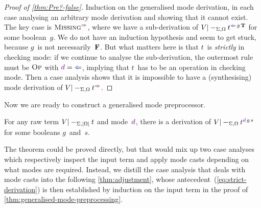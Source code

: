 \begin{proof}[Proof of \cref{thm:Pre?-false}]
Induction on the generalised mode derivation, in each case analysing an arbitrary mode derivation and showing that it cannot exist.
The key case is $\SynRule{Missing}$, where we have a sub-derivation of $V |-_{\Sigma,\Omega} t^{\chk\,g\,\True}$ for some boolean~$g$.
We do not have an induction hypothesis and seem to get stuck, because $g$~is not necessarily~$\mathbf{F}$.
But what matters here is that $t$~is \emph{strictly} in checking mode: if we continue to analyse the sub-derivation, the outermost rule must be $\textnormal{\textsc{Op}}$ with $\dir d = {\chk}$, implying that $t$~has to be an operation in checking mode.
Then a case analysis shows that it is impossible to have a (synthesising) mode derivation of $V |-_{\Sigma,\Omega} t^{\syn}$.
\end{proof}

Now we are ready to construct a generalised mode preprocessor.

\begin{theorem}\label{thm:generalised-mode-preprocessing}
For any raw term $V |-_{\Sigma,\left|\Omega\right|} t$ and mode~$\dir{d}$, there is a derivation of\/ $V |-_{\Sigma,\Omega} t^{\dir{d}\,g\,s}$ for some booleans $g$~and~$s$.
\end{theorem}

The theorem could be proved directly, but that would mix up two case analyses which respectively inspect the input term and apply mode casts depending on what modes are required.
Instead, we distill the case analysis that deals with mode casts into the following \cref{thm:adjustment}, whose antecedent~(\ref{eq:strict-derivation}) is then established by induction on the input term in the proof of \cref{thm:generalised-mode-preprocessing}.


